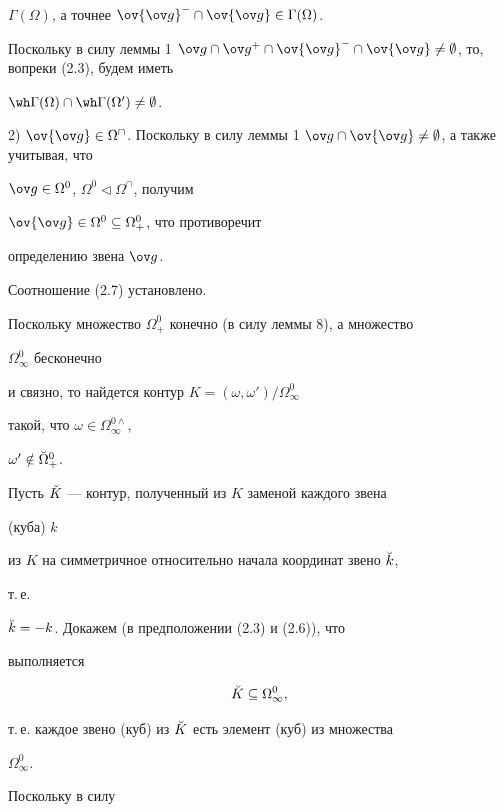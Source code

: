 \begin{pf}
$\Gamma(\Omega)$, а точнее $\ov{\ov g}^-\cap\ov{\ov 


g}\in\Gamma(\Omega)$. 


Поскольку в силу леммы 1\; $\ov g\cap\ov g^+\cap\ov{\ov g}^-\cap\ov{\ov 


g}\ne\emptyset$, то, вопреки (2.3), будем иметь 


$\wh\Gamma(\Omega)\cap\wh\Gamma(\Omega')\ne\emptyset$. 


 


2) $\ov{\ov g}\in\Omega^\cap$. Поскольку в силу леммы 1\; $\ov 


g\cap\ov{\ov g}\ne\emptyset$, а также учитывая, что 


$\ov g\in\Omega^0$, $\Omega^0\vartriangleleft\Omega^\cap$, получим 


$\ov{\ov g}\in\Omega^0\subseteq\Omega^0_+$, что противоречит 


определению звена $\ov g$. 


Соотношение (2.7) установлено. 


 


Поскольку множество $\Omega^0_+$ конечно (в силу леммы 8), а множество 


$\Omega^0_\infty$ бесконечно 


и связно, то найдется контур $K=(\omega,\omega')/\Omega^0_\infty$ 


такой, что $\omega\in\Omega^{0\wedge}_\infty$, 


$\omega'\notin\Breve\Omega^0_+$. 


Пусть $\Breve K$ --- контур, полученный из $K$ заменой каждого звена 


(куба) $k$ 


из $K$ на симметричное относительно начала координат звено $\Breve k$, 


т.\,е. 


$\Breve k=-k$. Докажем (в предположении (2.3) и (2.6)), что 


выполняется 


\begin{equation} 


\Breve K\subseteq\Omega^0_\infty, 


\end{equation} 


т.\,е. каждое звено (куб) из $\Breve K$ есть элемент (куб) из множества 


$\Omega^0_\infty$. 


Поскольку в силу 



\end{pf}
